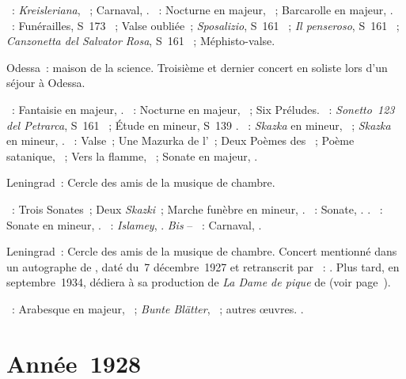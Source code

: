 \begin{description}
 \textsc{\Schumann{}}~: \emph{Kreisleriana}, ~; Carnaval, .
 \textsc{\Chopin{}}~: Nocturne en \kF majeur,  ~;
 Barcarolle en \kF \Sharp majeur, .
 \textsc{\Liszt{}}~: Funérailles, S~173 ~; Valse oubliée~;
 \emph{Sposalizio}, S~161 ~; \emph{Il penseroso}, S~161
 ~; \emph{Canzonetta del Salvator Rosa}, S~161 ~;
 Méphisto-valse.
 \item[\DateWithWeekDay{1927-11-05}]
 Odessa~: maison de la science.
 Troisième et dernier concert en soliste lors d'un séjour à Odessa.

 \textsc{\Schumann{}}~: Fantaisie en \kC majeur, .
 \textsc{\Chopin{}}~: Nocturne en \kF \Sharp majeur,  ~;
 Six Préludes.
 \textsc{\Liszt{}}~: \emph{Sonetto~123 del Petrarca}, S~161 ~;
 Étude en \kF mineur, S~139 .
 \textsc{\Medtner{}}~: \emph{Skazka} en \kF mineur,  ~;
 \emph{Skazka} en \kE mineur,  .
 \textsc{\Scriabine{}}~: Valse~; Une Mazurka de l'~; Deux Poèmes
 des ~; Poème satanique, ~; Vers la flamme,
 ~; Sonate en \kF \Sharp majeur, .
 \item[\DateWithWeekDay{1927-11-18}]
 Leningrad~: Cercle des amis de la musique de chambre.

 \textsc{\Medtner{}}~: Trois Sonates~; Deux \emph{Skazki}~; Marche funèbre
 en \kB mineur,  .
 \textsc{\Scriabine{}}~: Sonate, .
 \textsc{\Liszt{}}.
 \textsc{\Prokofiev{}}~: Sonate en \kA mineur, .
 \textsc{\Balakirev{}}~: \emph{Islamey}, .
 \emph{Bis} -- \textsc{\Schumann{}}~: Carnaval, .
 \item[\DateWithWeekDay{1927-12-02}]
 Leningrad~: Cercle des amis de la musique de chambre.
 Concert mentionné dans un autographe de \VMeyerhold{}, daté du~7
 décembre~1927 et retranscrit par \citet[p.~31]{Sofronitsky82a}~:
 .
 Plus tard, en septembre~1934, \VMeyerhold{} dédiera à \VSofronitsky{} sa
 production de \emph{La Dame de pique} de \Tchaikovski{} (voir
 page~\pageref{bio:LDDP}).

 \textsc{\Schumann{}}~: Arabesque en \kC majeur, ~; \emph{Bunte
 Blätter}, ~; autres œuvres.
 \textsc{\Chopin{}}.
\end{description}

\section{Année~1928}

